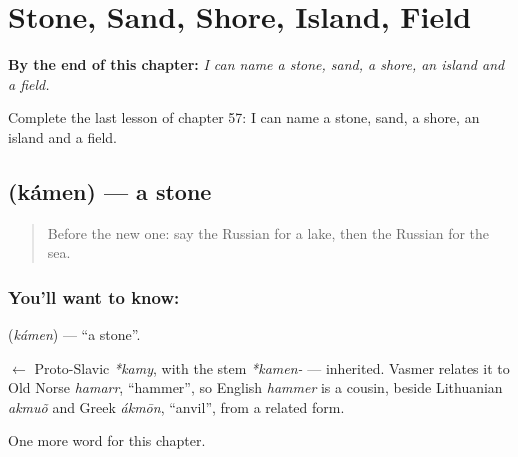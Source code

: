 
\chapter{Stone, Sand, Shore, Island, Field}
\label{ch:ru-stone-sand-shore-island-field}

\begin{chapteropening}
\textbf{By the end of this chapter:} \emph{I can name a stone, sand, a shore, an island and a field.}

Complete the last lesson of chapter 57: I can name a stone, sand, a shore, an island and a field.
\end{chapteropening}

\section[\texorpdfstring{\ru{камень} (kámen)}{камень (kámen)}]{ (kámen) — a stone}

\label{lesson:RU-C57-stone}



\begin{quote}
Before the new one: say the Russian for a lake, then the Russian for the sea.
\end{quote}

\subsection*{You'll want to know: }
\textbf{} (\emph{kámen}) — \textquotedblleft{}a stone\textquotedblright{}.

\begin{cousinweb}
\textbf{} $\leftarrow$ Proto-Slavic \emph{*kamy}, with the stem \emph{*kamen-} — inherited. Vasmer relates it to Old Norse \emph{hamarr}, \textquotedblleft{}hammer\textquotedblright{}, so English \emph{hammer} is a cousin, beside Lithuanian \emph{akmuõ} and Greek \emph{ákmōn}, \textquotedblleft{}anvil\textquotedblright{}, from a related form.
\end{cousinweb}

\begin{grammarlens}[title={What you've built}]
One more word for this chapter.
\end{grammarlens}

